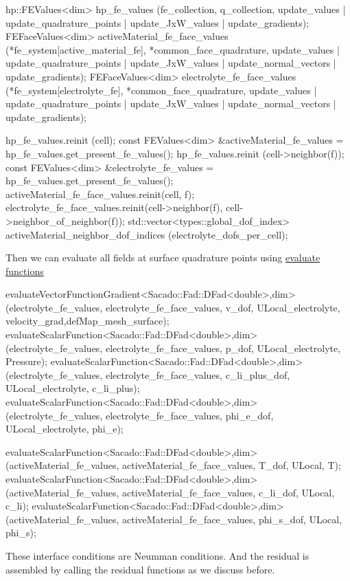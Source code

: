 \begin{DoxyCode}
  hp::FEValues<dim> hp\_fe\_values (fe\_collection, q\_collection, update\_values | update\_quadrature\_points  | 
      update\_JxW\_values | update\_gradients);
FEFaceValues<dim> activeMaterial\_fe\_face\_values (*fe\_system[active\_material\_fe], *common\_face\_quadrature, 
      update\_values | update\_quadrature\_points | update\_JxW\_values | update\_normal\_vectors | update\_gradients);
FEFaceValues<dim> electrolyte\_fe\_face\_values (*fe\_system[electrolyte\_fe], *common\_face\_quadrature, 
      update\_values | update\_quadrature\_points | update\_JxW\_values | update\_normal\_vectors | update\_gradients); 
  
  hp\_fe\_values.reinit (cell);
  \textcolor{keyword}{const} FEValues<dim> &activeMaterial\_fe\_values = hp\_fe\_values.get\_present\_fe\_values();
  hp\_fe\_values.reinit (cell->neighbor(f));
  \textcolor{keyword}{const} FEValues<dim> &electrolyte\_fe\_values = hp\_fe\_values.get\_present\_fe\_values();
  activeMaterial\_fe\_face\_values.reinit(cell, f);
  electrolyte\_fe\_face\_values.reinit(cell->neighbor(f), cell->neighbor\_of\_neighbor(f));
  std::vector<types::global\_dof\_index> activeMaterial\_neighbor\_dof\_indices (electrolyte\_dofs\_per\_cell);
\end{DoxyCode}
 Then we can evaluate all fields at surface quadrature points using \hyperlink{group___evaluation_functions_ga2e2fbeb2173113c6889c73bbb7304789}{evaluate functions } 
\begin{DoxyCode}
evaluateVectorFunctionGradient<Sacado::Fad::DFad<double>,dim>(electrolyte\_fe\_values, 
      electrolyte\_fe\_face\_values, v\_dof, ULocal\_electrolyte, velocity\_grad,defMap\_mesh\_surface);
evaluateScalarFunction<Sacado::Fad::DFad<double>,dim>(electrolyte\_fe\_values, electrolyte\_fe\_face\_values, 
      p\_dof, ULocal\_electrolyte, Pressure);
evaluateScalarFunction<Sacado::Fad::DFad<double>,dim>(electrolyte\_fe\_values, electrolyte\_fe\_face\_values, 
      c\_li\_plus\_dof, ULocal\_electrolyte, c\_li\_plus);
evaluateScalarFunction<Sacado::Fad::DFad<double>,dim>(electrolyte\_fe\_values, electrolyte\_fe\_face\_values, 
      phi\_e\_dof, ULocal\_electrolyte, phi\_e);

evaluateScalarFunction<Sacado::Fad::DFad<double>,dim>(activeMaterial\_fe\_values, 
      activeMaterial\_fe\_face\_values, T\_dof, ULocal, T);
evaluateScalarFunction<Sacado::Fad::DFad<double>,dim>(activeMaterial\_fe\_values, 
      activeMaterial\_fe\_face\_values, c\_li\_dof, ULocal, c\_li);
evaluateScalarFunction<Sacado::Fad::DFad<double>,dim>(activeMaterial\_fe\_values, 
      activeMaterial\_fe\_face\_values, phi\_s\_dof, ULocal, phi\_s);
\end{DoxyCode}
 These interface conditions are Neumman conditions. And the residual is assembled by calling the residual functions as we discuss before.

